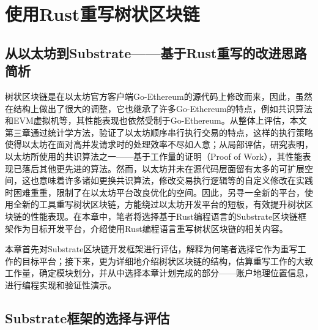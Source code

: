 %
%
%
%
%

\chapter{使用Rust重写树状区块链}

\section{从以太坊到Substrate——基于Rust重写的改进思路简析}

树状区块链是在以太坊官方客户端Go-Ethereum的源代码上修改而来，因此，虽然在结构上做出了很大的调整，它也继承了许多Go-Ethereum的特点，例如共识算法和EVM虚拟机等，其性能表现也依然受制于Go-Ethereum。从整体上评估，本文第三章通过统计学方法，验证了以太坊顺序串行执行交易的特点，这样的执行策略使得以太坊在面对高并发请求时的处理效率不尽如人意；从局部评估，研究\cite{privateChainConsensus}表明，以太坊所使用的共识算法之一——基于工作量的证明（Proof of Work），其性能表现已落后其他更先进的算法。然而，以太坊并未在源代码层面留有太多的可扩展空间，这也意味着许多诸如更换共识算法，修改交易执行逻辑等的自定义修改在实践时困难重重，限制了在以太坊平台改良优化的空间。因此，另寻一全新的平台，使用全新的工具重写树状区块链，方能绕过以太坊开发平台的短板，有效提升树状区块链的性能表现。在本章中，笔者将选择基于Rust编程语言的Substrate区块链框架作为目标开发平台，介绍使用Rust编程语言重写树状区块链的相关内容。

本章首先对Substrate区块链开发框架进行评估，解释为何笔者选择它作为重写工作的目标平台；接下来，更为详细地介绍树状区块链的结构，估算重写工作的大致工作量，确定模块划分，并从中选择本章计划完成的部分——账户地理位置信息，进行编程实现和验证性演示。

\section{Substrate框架的选择与评估}

